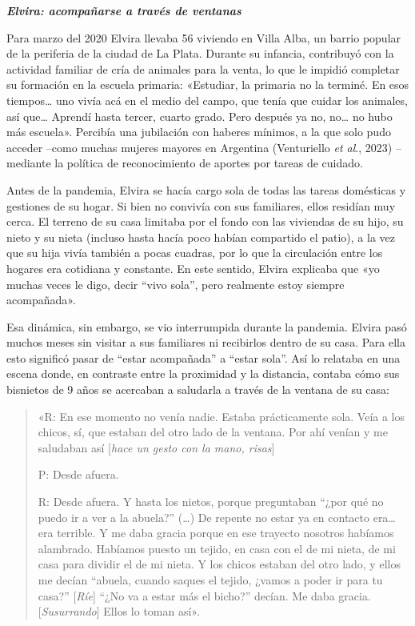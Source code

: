 \emph{\textbf{Elvira: acompañarse a través de ventanas}}

Para marzo del 2020 Elvira llevaba 56 viviendo en Villa Alba, un barrio popular de la periferia de la ciudad de La Plata. Durante su infancia, contribuyó con la actividad familiar de cría de animales para la venta, lo que le impidió completar su formación en la escuela primaria: «Estudiar, la primaria no la terminé. En esos tiempos\ldots{} uno vivía acá en el medio del campo, que tenía que cuidar los animales, así que\ldots{} Aprendí hasta tercer, cuarto grado. Pero después ya no, no\ldots{} no hubo más escuela». Percibía una jubilación con haberes mínimos, a la que solo pudo acceder --como muchas mujeres mayores en Argentina (Venturiello \emph{et al}., 2023) -- mediante la política de reconocimiento de aportes por tareas de cuidado.

Antes de la pandemia, Elvira se hacía cargo sola de todas las tareas domésticas y gestiones de su hogar. Si bien no convivía con sus familiares, ellos residían muy cerca. El terreno de su casa limitaba por el fondo con las viviendas de su hijo, su nieto y su nieta (incluso hasta hacía poco habían compartido el patio), a la vez que su hija vivía también a pocas cuadras, por lo que la circulación entre los hogares era cotidiana y constante. En este sentido, Elvira explicaba que «yo muchas veces le digo, decir ``vivo sola'', pero realmente estoy siempre acompañada».

Esa dinámica, sin embargo, se vio interrumpida durante la pandemia. Elvira pasó muchos meses sin visitar a sus familiares ni recibirlos dentro de su casa. Para ella esto significó pasar de ``estar acompañada'' a ``estar sola''. Así lo relataba en una escena donde, en contraste entre la proximidad y la distancia, contaba cómo sus bisnietos de 9 años se acercaban a saludarla a través de la ventana de su casa:

\begin{quote}
«R: En ese momento no venía nadie. Estaba prácticamente sola. Veía a los chicos, sí, que estaban del otro lado de la ventana. Por ahí venían y me saludaban así {[}\emph{hace un gesto con la mano, risas}{]}

P: Desde afuera.

R: Desde afuera. Y hasta los nietos, porque preguntaban ``¿por qué no puedo ir a ver a la abuela?'' (\ldots) De repente no estar ya en contacto era\ldots{} era terrible. Y me daba gracia porque en ese trayecto nosotros habíamos alambrado. Habíamos puesto un tejido, en casa con el de mi nieta, de mi casa para dividir el de mi nieta. Y los chicos estaban del otro lado, y ellos me decían ``abuela, cuando saques el tejido, ¿vamos a poder ir para tu casa?'' {[}\emph{Ríe}{]} ``¿No va a estar más el bicho?'' decían. Me daba gracia. {[}\emph{Susurrando}{]} Ellos lo toman así».
\end{quote}

